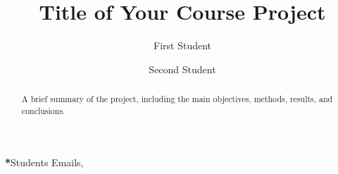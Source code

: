 \documentclass[12pt]{spieman}  %
\title{Title of Your Course Project}
\author[a]{First Student}
\author[a]{Second Student}
\affil[a]{Norwegian University of Life Sciences, REALTEK, Industrial Economics (INDØK)}
\begin{document}
 
\maketitle

\begin{abstract}
A brief summary of the project, including the main objectives, methods, results, and conclusions.
\end{abstract}


{\noindent \footnotesize\textbf{*}Students Emails,   }
\end{document}
